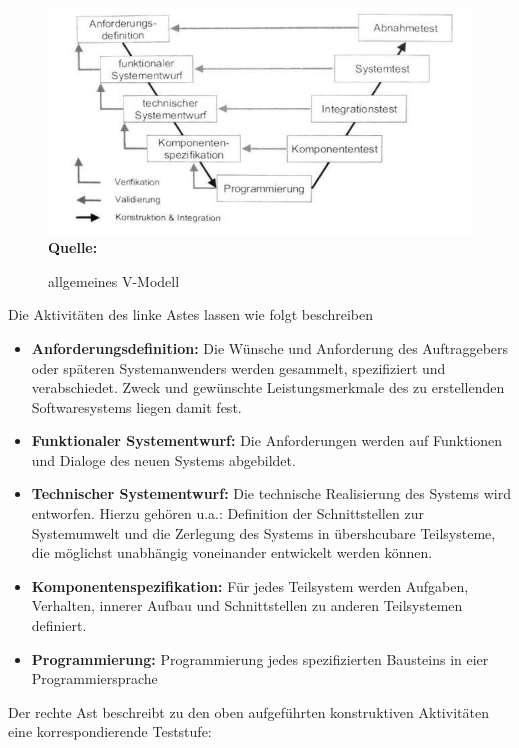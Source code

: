\begin{figure}[htb]
  \centering  
  \includegraphics[scale=0.8]{img/vModell.jpg}\\
  \footnotesize\sffamily\textbf{Quelle:} \cite{spillner_basiswissen_2007}
  \caption{allgemeines V-Modell}
  \label{fig:vModel}
\end{figure}


Die Aktivitäten des linke Astes lassen wie folgt beschreiben \cite{spillner_basiswissen_2007}

\begin{itemize}
      \item \textbf{Anforderungsdefinition:} Die Wünsche und Anforderung des Auftraggebers oder späteren Systemanwenders werden gesammelt, spezifiziert und verabschiedet. Zweck und gewünschte Leistungsmerkmale des zu erstellenden Softwaresystems liegen damit fest.
      \item \textbf{Funktionaler Systementwurf:} Die Anforderungen werden auf Funktionen und Dialoge des neuen Systems abgebildet.
      \item \textbf{Technischer Systementwurf:} Die technische Realisierung des Systems wird entworfen. Hierzu gehören u.a.: Definition der Schnittstellen zur Systemumwelt und die Zerlegung des Systems in übershcubare Teilsysteme, die möglichst unabhängig voneinander entwickelt werden können.
      \item \textbf{Komponentenspezifikation:} Für jedes Teilsystem werden Aufgaben, Verhalten, innerer Aufbau und Schnittstellen zu anderen Teilsystemen definiert.
      \item \textbf{Programmierung:} Programmierung jedes spezifizierten Bausteins in eier Programmiersprache 
\end{itemize}


Der rechte Ast beschreibt zu den oben aufgeführten konstruktiven Aktivitäten eine korrespondierende Teststufe: \cite{spillner_basiswissen_2007}

